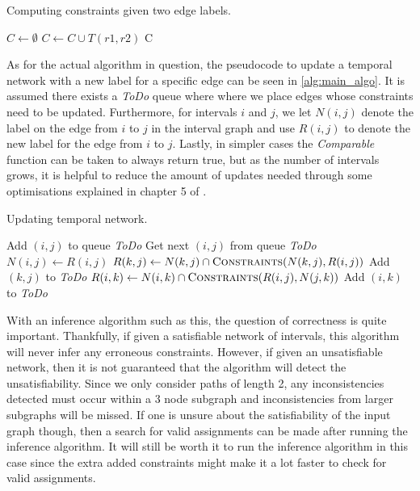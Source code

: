 \begin{algorithm}
  \caption{Computing constraints given two edge labels. \cite{allen83}}\label{alg:constraints}
  \begin{algorithmic}
    \State $C \gets \emptyset$
        \State $C \gets C \cup T(r1,r2)$
      \EndFor
    \EndFor
    \State \Return C
    \EndFunction
  \end{algorithmic}
\end{algorithm}

As for the actual algorithm in question,
the pseudocode to update a temporal network with a new label for a specific edge can be
seen in \cref{alg:main_algo}. It is assumed there exists a \textit{ToDo} queue
where where we place edges whose constraints need to be updated. Furthermore, for
intervals $i$ and $j$, we let $N(i,j)$ denote the label on the edge from $i$ to $j$ in the interval
graph and use $R(i,j)$ to denote the new label for the edge from $i$ to $j$.
Lastly, in simpler cases the \textit{Comparable} function can be taken to always return true, but
as the number of intervals grows, it is helpful to reduce the amount of updates needed through some
optimisations explained in chapter 5 of \cite{allen83}.

\begin{algorithm}
  \caption{Updating temporal network. \cite{allen83}}\label{alg:main_algo}
  \begin{algorithmic}
      \State Add $(i,j)$ to queue \textit{ToDo}
        \State Get next $(i,j)$ from queue \textit{ToDo}
        \State $N(i,j) \gets R(i,j)$
          \State $R(k, j) \gets N(k,j) \cap \Call{Constraints}{N(k,j), R(i,j)}$
            \State Add $(k,j)$ to \textit{ToDo}
          \EndIf
        \EndFor
          \State $R(i, k) \gets N(i,k) \cap \Call{Constraints}{R(i,j), N(j,k)}$
            \State Add $(i,k)$ to \textit{ToDo}
          \EndIf
        \EndFor
      \EndWhile
    \EndProcedure
  \end{algorithmic}
\end{algorithm}

With an inference algorithm such as this, the question of correctness is quite important.
Thankfully, if given a satisfiable network of intervals, this algorithm will never infer any
erroneous constraints. However, if given an unsatisfiable network, then it is not guaranteed that
the algorithm will detect the unsatisfiability. Since we only consider paths of length 2, any 
inconsistencies detected must occur within a 3 node subgraph and inconsistencies from larger
subgraphs will be missed. If one is unsure about the satisfiability of the input graph though,
then a search for valid assignments can be made after running the inference algorithm. It will
still be worth it to run the inference algorithm in this case since the extra added constraints
might make it a lot faster to check for valid assignments.


